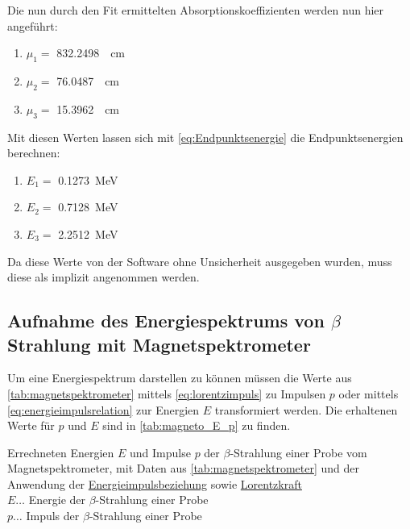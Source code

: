\documentclass[12pt,english,ngerman]{scrartcl}
\begin{document}
Die nun durch den Fit ermittelten Absorptionskoeffizienten werden nun hier
angeführt:

\begin{enumerate}
	\item $\mu_1 = $ \SI{832.2498}{\per\cm}
	\item $\mu_2 = $ \SI{76.0487}{\per\cm}
	\item $\mu_3 = $ \SI{15.3962}{\per\cm}
\end{enumerate}

Mit diesen Werten lassen sich mit \autoref{eq:Endpunktsenergie} die
Endpunktsenergien berechnen:

\begin{enumerate}
	\item $E_1 = $ \SI{0.1273}{\mega\electronvolt}
	\item $E_2 = $ \SI{0.7128}{\mega\electronvolt}
	\item $E_3 = $ \SI{2.2512}{\mega\electronvolt}
\end{enumerate}

Da diese Werte von der Software ohne Unsicherheit ausgegeben wurden, muss diese
als implizit angenommen werden.

\subsection{Aufnahme des Energiespektrums von \texorpdfstring{$\beta$}{beta}
	Strahlung mit Magnetspektrometer}

Um eine Energiespektrum darstellen zu können müssen die Werte aus
\autoref{tab:magnetspektrometer} mittels \autoref{eq:lorentzimpuls} zu Impulsen
$p$ oder mittels \autoref{eq:energieimpulsrelation} zur Energien $E$
transformiert werden. Die erhaltenen Werte für $p$ und $E$ sind in
\autoref{tab:magneto_E_p} zu finden.

\begin{table}[H]
	\caption[Energie- und Impulswerte der $\beta$-Strahlung einer  Probe]{
		Errechneten Energien $E$ und Impulse $p$ der $\beta$-Strahlung einer
		 Probe vom Magnetspektrometer, mit Daten aus
		\autoref{tab:magnetspektrometer} und der Anwendung der
		\hyperref[eq:energieimpulsrelation]{Energieimpulsbeziehung} sowie
		\hyperref[eq:lorentzimpuls]{Lorentzkraft}                                                          \\
		$E \dots$ Energie der $\beta$-Strahlung einer  Probe \\
		$p \dots$ Impuls der $\beta$-Strahlung einer  Probe  \\
	}\label{tab:magneto_E_p}
	\centering
	
\end{table}
\end{document}
